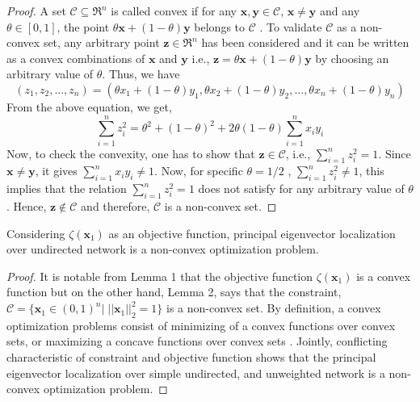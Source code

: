 \documentclass[envcountreset,oribibl]{llncs}
\begin{document}
\begin{proof}
A set $\mathcal{C} \subseteq \Re^n$ is called convex if for any ${\bm{x}, \bm{y}} \in \mathcal{C}$, ${\bm{x}\neq \bm{y}}$ and any $\theta \in [0, 1]$, the point $\theta \bm{x} + (1-\theta)\bm{y}$ belongs to $\mathcal{C}$ \cite{nonlinear_opt_2014}. 
To validate $\mathcal{C}$ as a non-convex set, any arbitrary point $\bm{z} \in \Re^n $  has been considered and it can be written as a convex combinations of $\bm{x}$ and $\bm{y}$ i.e., $\bm{z}=\theta \bm{x} + (1-\theta)\bm{y}$ by choosing
an arbitrary value of $\theta$. Thus, we have
\begin{equation}
(z_1,z_2,\ldots,z_n)=(\theta x_1+(1-\theta)y_1,\theta x_2+(1-\theta)y_2,\ldots,\theta x_n+(1-\theta)y_n) 
\end{equation}
From the above equation, we get, 
\begin{equation}
\sum_{i=1}^n z_i^2=\theta^2+(1-\theta)^2+2\theta(1-\theta)\sum_{i=1}^n x_iy_i 
\end{equation}
Now, to check the convexity, one has to show that $\bm{z} \in \mathcal{C}$, i.e., $\sum_{i=1}^n z_i^2=1$.
Since ${\bm{x}\neq \bm{y}}$, it gives $\sum_{i=1}^n x_iy_i\neq 1$. Now, for specific $\theta=1/2$ , $\sum_{i=1}^n z_i^2 \neq 1$, this implies that the relation  $\sum_{i=1}^n z_i^2=1$ does not satisfy for any arbitrary value of $\theta$. Hence, $\bm{z} \notin \mathcal{C}$ and therefore, $\mathcal{C}$ is a non-convex set.
\end{proof}
\begin{theorem}
 Considering $\zeta(\bm{x}_1)$ as an objective function, principal eigenvector localization over undirected network is a non-convex optimization problem. 
\end{theorem}  
\begin{proof}
It is notable from Lemma 1 that the objective function $\zeta(\bm{x}_1)$ is a convex function but on the other hand, Lemma 2, says that the constraint, $\mathcal{C}=\{ {\bm{x}_1} \in (0,1)^n|\;||{\bm{x}_1}||^2_2=1\}$ is a non-convex set. By definition, a convex optimization problems consist of minimizing of a convex functions over convex sets, or maximizing a concave functions over convex sets \cite{nonlinear_opt_2014}.
Jointly, conflicting characteristic of constraint and objective function shows that the principal eigenvector localization over simple undirected, and unweighted network is a non-convex optimization problem.
\end{proof}
\end{document}
